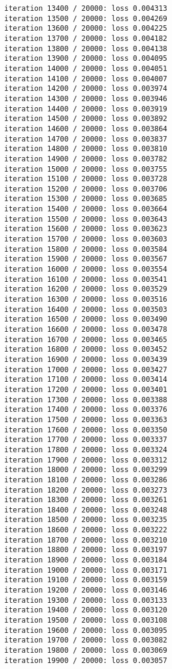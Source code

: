 \documentclass[11pt]{article}
\begin{document}
\begin{Verbatim}[commandchars=\\\{\}]
iteration 13400 / 20000: loss 0.004313
iteration 13500 / 20000: loss 0.004269
iteration 13600 / 20000: loss 0.004225
iteration 13700 / 20000: loss 0.004182
iteration 13800 / 20000: loss 0.004138
iteration 13900 / 20000: loss 0.004095
iteration 14000 / 20000: loss 0.004051
iteration 14100 / 20000: loss 0.004007
iteration 14200 / 20000: loss 0.003974
iteration 14300 / 20000: loss 0.003946
iteration 14400 / 20000: loss 0.003919
iteration 14500 / 20000: loss 0.003892
iteration 14600 / 20000: loss 0.003864
iteration 14700 / 20000: loss 0.003837
iteration 14800 / 20000: loss 0.003810
iteration 14900 / 20000: loss 0.003782
iteration 15000 / 20000: loss 0.003755
iteration 15100 / 20000: loss 0.003728
iteration 15200 / 20000: loss 0.003706
iteration 15300 / 20000: loss 0.003685
iteration 15400 / 20000: loss 0.003664
iteration 15500 / 20000: loss 0.003643
iteration 15600 / 20000: loss 0.003623
iteration 15700 / 20000: loss 0.003603
iteration 15800 / 20000: loss 0.003584
iteration 15900 / 20000: loss 0.003567
iteration 16000 / 20000: loss 0.003554
iteration 16100 / 20000: loss 0.003541
iteration 16200 / 20000: loss 0.003529
iteration 16300 / 20000: loss 0.003516
iteration 16400 / 20000: loss 0.003503
iteration 16500 / 20000: loss 0.003490
iteration 16600 / 20000: loss 0.003478
iteration 16700 / 20000: loss 0.003465
iteration 16800 / 20000: loss 0.003452
iteration 16900 / 20000: loss 0.003439
iteration 17000 / 20000: loss 0.003427
iteration 17100 / 20000: loss 0.003414
iteration 17200 / 20000: loss 0.003401
iteration 17300 / 20000: loss 0.003388
iteration 17400 / 20000: loss 0.003376
iteration 17500 / 20000: loss 0.003363
iteration 17600 / 20000: loss 0.003350
iteration 17700 / 20000: loss 0.003337
iteration 17800 / 20000: loss 0.003324
iteration 17900 / 20000: loss 0.003312
iteration 18000 / 20000: loss 0.003299
iteration 18100 / 20000: loss 0.003286
iteration 18200 / 20000: loss 0.003273
iteration 18300 / 20000: loss 0.003261
iteration 18400 / 20000: loss 0.003248
iteration 18500 / 20000: loss 0.003235
iteration 18600 / 20000: loss 0.003222
iteration 18700 / 20000: loss 0.003210
iteration 18800 / 20000: loss 0.003197
iteration 18900 / 20000: loss 0.003184
iteration 19000 / 20000: loss 0.003171
iteration 19100 / 20000: loss 0.003159
iteration 19200 / 20000: loss 0.003146
iteration 19300 / 20000: loss 0.003133
iteration 19400 / 20000: loss 0.003120
iteration 19500 / 20000: loss 0.003108
iteration 19600 / 20000: loss 0.003095
iteration 19700 / 20000: loss 0.003082
iteration 19800 / 20000: loss 0.003069
iteration 19900 / 20000: loss 0.003057

    \end{Verbatim}
\end{document}
